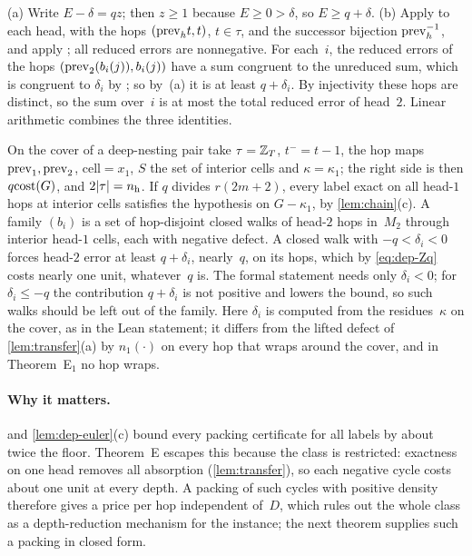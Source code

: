 \begin{outline}
(a) Write $E-\delta=qz$; then $z\ge1$ because $E\ge0>\delta$, so $E\ge q+\delta$. (b) Apply  to
each head, with the hops $(\mathrm{prev}_ht,t)$, $t\in\tau$, and the successor bijection $\mathrm{prev}_h^{-1}$, and apply
; all reduced errors are nonnegative. For each~$i$, the reduced errors of the hops
$(\mathrm{prev}_2(b_i(j)),b_i(j))$ have a sum congruent to the unreduced sum, which is congruent to $\delta_i$ by
; so by~(a) it is at least $q+\delta_i$. By injectivity these hops are distinct, so the sum
over~$i$ is at most the total reduced error of head~$2$. Linear arithmetic combines the three identities.
\end{outline}

On the cover of a deep-nesting pair take $\tau=\mathbb{Z}_T$, $t^-=t-1$, the hop maps $\mathrm{prev}_1,\mathrm{prev}_2$, $\mathrm{cell}=x_1$,
$S$ the set of interior cells and $\kappa=\kappa_1$; the right side is then $q\mathrm{cost}(G)$, and $2\lvert \tau \rvert=n_{\mathrm h}$.
If $q$ divides $r(2m+2)$, every label exact on all head-$1$ hops at interior cells satisfies the hypothesis on
$G-\kappa_1$, by \cref{lem:chain}(c). A family $(b_i)$ is a set of hop-disjoint closed walks of head-$2$ hops in~$M_2$
through interior head-$1$ cells, each with negative defect. A closed walk with $-q<\delta_i<0$ forces head-$2$ error at
least $q+\delta_i$, nearly~$q$, on its hops, which by \eqref{eq:dep-Zq} costs nearly one unit, whatever~$q$ is. The
formal statement needs only $\delta_i<0$; for $\delta_i\le-q$ the contribution $q+\delta_i$ is not positive and lowers
the bound, so such walks should be left out of the family. Here $\delta_i$ is computed from the residues~$\kappa$ on the
cover, as in the Lean statement; it differs from the lifted defect of \cref{lem:transfer}(a) by $n_1(\cdot)$ on every
hop that wraps around the cover, and in Theorem~E$_1$ no hop wraps.

\paragraph{Why it matters.}  and \cref{lem:dep-euler}(c) bound every packing certificate for all
labels by about twice the floor. Theorem~E escapes this because the class is restricted: exactness on one head removes
all absorption (\cref{lem:transfer}), so each negative cycle costs about one unit at every depth. A packing of such
cycles with positive density therefore gives a price per hop independent of~$D$, which rules out the whole class as a
depth-reduction mechanism for the instance; the next theorem supplies such a packing in closed form.

